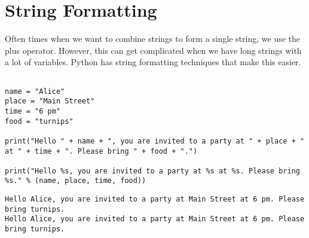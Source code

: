 \documentclass[11pt]{article}
\begin{document}
\section{String Formatting}
\label{sec:org13b5d5d}

Often times when we want to combine strings to form a single string, we use the plus operator. However, this can get complicated when we have long strings with a lot of variables. Python has string formatting techniques that make this easier.

\begin{verbatim}

name = "Alice"
place = "Main Street"
time = "6 pm"
food = "turnips"

print("Hello " + name + ", you are invited to a party at " + place + " at " + time + ". Please bring " + food + ".")

print("Hello %s, you are invited to a party at %s at %s. Please bring %s." % (name, place, time, food))

\end{verbatim}

\begin{verbatim}
Hello Alice, you are invited to a party at Main Street at 6 pm. Please bring turnips.
Hello Alice, you are invited to a party at Main Street at 6 pm. Please bring turnips.
\end{verbatim}
\end{document}
